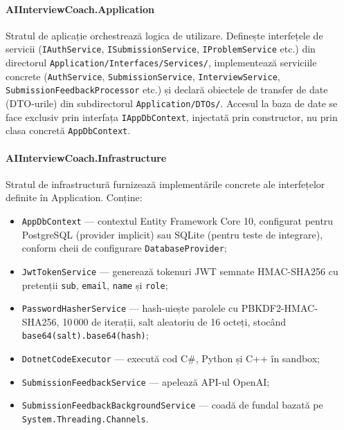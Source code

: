 \paragraph{AIInterviewCoach.Application}
Stratul de aplicație orchestrează logica de utilizare.
Definește interfețele de servicii (\texttt{IAuthService}, \texttt{ISubmissionService},
\texttt{IProblemService} etc.) din directorul
\texttt{Application/Interfaces/Services/},
implementează serviciile concrete (\texttt{AuthService}, \texttt{SubmissionService},
\texttt{InterviewService}, \texttt{SubmissionFeedbackProcessor} etc.)
și declară obiectele de transfer de date (DTO-urile) din subdirectorul
\texttt{Application/DTOs/}.
Accesul la baza de date se face exclusiv prin interfața \texttt{IAppDbContext},
injectată prin constructor, nu prin clasa concretă \texttt{AppDbContext}.

\paragraph{AIInterviewCoach.Infrastructure}
Stratul de infrastructură furnizează implementările concrete ale
interfețelor definite în Application.
Conține:
\begin{itemize}
  \item \texttt{AppDbContext} — contextul Entity Framework Core 10,
        configurat pentru PostgreSQL (provider implicit) sau SQLite
        (pentru teste de integrare), conform cheii de configurare
        \texttt{DatabaseProvider};
  \item \texttt{JwtTokenService} — generează tokenuri JWT semnate HMAC-SHA256
        cu pretenții \texttt{sub}, \texttt{email}, \texttt{name} și \texttt{role};
  \item \texttt{PasswordHasherService} — hash-uiește parolele cu PBKDF2-HMAC-SHA256,
        10\,000 de iterații, salt aleatoriu de 16 octeți, stocând
        \texttt{base64(salt).base64(hash)};
  \item \texttt{DotnetCodeExecutor} — execută cod C\#, Python și C++ în sandbox;
  \item \texttt{SubmissionFeedbackService} — apelează API-ul OpenAI;
  \item \texttt{SubmissionFeedbackBackgroundService} — coadă de fundal bazată
        pe \texttt{System.Threading.Channels}.
\end{itemize}

